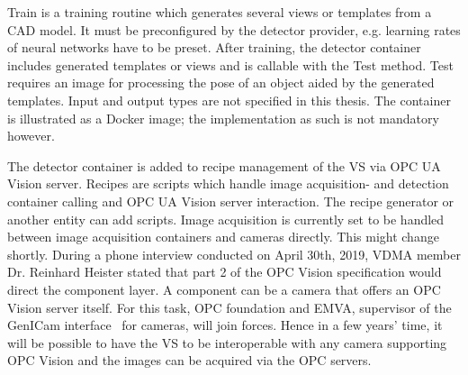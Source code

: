 Train is a training routine which generates several views or templates from a CAD model. It must be preconfigured by the detector provider, e.g. learning rates of neural networks have to be preset. After training, the detector container includes generated templates or views and is callable with the Test method.  Test requires an image for processing the pose of an object aided by the generated templates.  Input and output types are not specified in this thesis. The container is illustrated as a Docker image; the implementation as such is not mandatory however. 

The detector container is added to recipe management of the VS via OPC UA Vision server. Recipes are scripts which handle image acquisition- and detection container calling and OPC UA Vision server interaction. The recipe generator or another entity can add scripts. Image acquisition is currently set to be handled between image acquisition containers and cameras directly. This might change shortly. During a phone interview conducted on April 30th, 2019, VDMA member Dr. Reinhard Heister stated that part 2 of the OPC Vision specification would direct the component layer. A component can be a camera that offers an OPC Vision server itself. For this task, OPC foundation and EMVA, supervisor of the GenICam interface~\cite{EMVA2019GenICam2019} for cameras, will join forces. Hence in a few years' time, it will be possible to have the VS to be interoperable with any camera supporting OPC Vision and the images can be acquired via the OPC servers.



